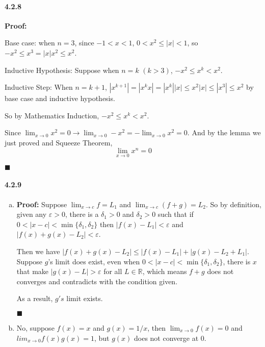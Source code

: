\documentclass[11pt]{article}
\newcommand{\qed}{
	\begin{flushright}
		$\blacksquare$
	\end{flushright}}
\begin{document}
	\paragraph{4.2.8}\textbf{Proof:}
	
	Base case: when $n = 3$, since $-1 < x < 1$, $0 < x^2 \leq |x| < 1$, so $-x^2 \leq x^3 = |x|x^2 \leq x^2$.
	
	Inductive Hypothesis: Suppose when $n = k$ $(k > 3)$, $-x^2 \leq x^k < x^2$.
	
	Inductive Step: When $n = k + 1$, $|x^{k + 1}| = |x^kx| = |x^k||x| \leq x^2|x| \leq |x^3| \leq x^2$ by base case and inductive hypothesis. 
	
	So by Mathematics Induction, $-x^2 \leq x^k < x^2$.
	
	Since $\lim_{x\rightarrow 0} x^2 = 0 \rightarrow \lim_{x\rightarrow 0} -x^2 = -\lim_{x\rightarrow 0}x^2 = 0$. And by the lemma we just proved and Squeeze Theorem, 
	\[\lim_{x \rightarrow 0} x^n = 0\]
	\qed
	
	\paragraph{4.2.9}
	\begin{enumerate}[(a)]
		\item \textbf{Proof:}
			Suppose $\lim_{x\rightarrow c} f = L_1$ and $\lim_{x\rightarrow c} (f + g) = L_2$. So by definition, given any $\varepsilon > 0$, there is a $\delta_1 > 0$ and $\delta_2 > 0$ such that if $0 < |x - c| < \min\{\delta_1, \delta_2\}$ then $|f(x) - L_1| < \varepsilon$ and $|f(x) + g(x) - L_2| < \varepsilon$. 
			
			Then we have $|f(x) + g(x) - L_2| \leq |f(x) - L_1| + |g(x) - L_2 + L_1|$. Suppose $g$'s limit does exist, even when $0 < |x - c| < \min\{\delta_1, \delta_2\}$, there is $x$ that make $|g(x) - L| > \varepsilon$ for all $L \in \mathbb{R}$, which means $f + g$ does not converges and contradicts with the condition given.
			
			As a result, $g's$ limit exists.
			\qed
		\item No, suppose $f(x) = x$ and $g(x) = 1/x$, then $\lim_{x \rightarrow 0}f(x) = 0$ and $lim_{x \rightarrow 0}f(x)g(x) = 1$, but $g(x)$ does not converge at $0$. 
	\end{enumerate}
\end{document}
